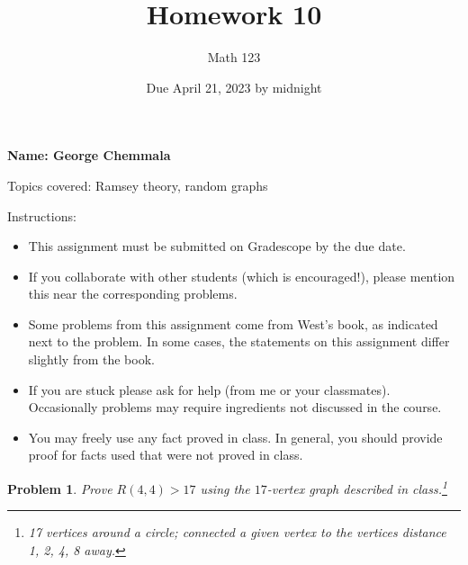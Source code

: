 \documentclass[11pt]{article}
\author{Math 123}
\date{Due April 21, 2023 by midnight}
\title{Homework 10}
\newtheorem{problem}{Problem}
\begin{document}
\maketitle

{\bf\Large Name: George Chemmala} 


\vspace{.3in}
Topics covered: Ramsey theory, random graphs

Instructions: 
\begin{itemize}
\item This assignment must be submitted on Gradescope by the due date. 
\item If you collaborate with other students (which is encouraged!), please mention this near the corresponding problems. 
\item Some problems from this assignment come from West's book, as indicated next to the problem. In some cases, the statements on this assignment differ slightly from the book. 
\item If you are stuck please ask for help (from me or your classmates). Occasionally problems may require ingredients not discussed in the course. 
\item You may freely use any fact proved in class. In general, you should provide proof for facts used that were not proved in class. 
\end{itemize}

\pagebreak 

\begin{problem}
Prove $R(4,4)>17$ using the $17$-vertex graph described in class.\footnote{17 vertices around a circle; connected a given vertex to the vertices distance 1, 2, 4, 8 away.}
\end{problem}
\end{document}
